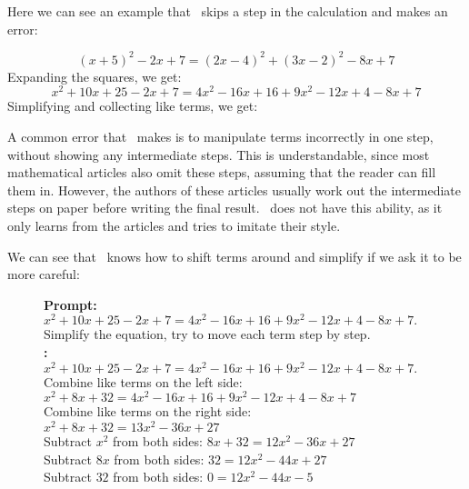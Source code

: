 Here we can see an example that \DV \ skips a step in the calculation and makes an error:

\begin{AIbox}{\DV}\scriptsize
$$(x + 5)^2 - 2x + 7 = (2x - 4)^2 + (3x - 2)^2 - 8x + 7$$
Expanding the squares, we get:
$$x^2 + 10x + 25 - 2x + 7 = 4x^2 - 16x + 16 + 9x^2 - 12x + 4 - 8x + 7$$
Simplifying and collecting like terms, we get:
\end{AIbox}


A common error that \DV \ makes is to manipulate terms incorrectly in one step, without showing any intermediate steps. This is understandable, since most mathematical articles also omit these steps, assuming that the reader can fill them in. However, the authors of these articles usually work out the intermediate steps on paper before writing the final result. \DV \ does not have this ability, as it only learns from the articles and tries to imitate their style.

We can see that \DV \ knows how to shift terms around and simplify if we ask it to be more careful:
\begin{figure}[H]
\begin{AIbox}{\DV}
{\bf Prompt:} \\
{\scriptsize
$x^2 + 10x + 25 - 2x + 7 = 4x^2 - 16x + 16 + 9x^2 - 12x + 4 - 8x + 7.$\\
Simplify the equation, try to move each term step by step. 
}\\

{\bf \DV:} \\
{\scriptsize
$x^2 + 10x + 25 - 2x + 7 = 4x^2 - 16x + 16 + 9x^2 - 12x + 4 - 8x + 7.$\\
Combine like terms on the left side: $x^2 + 8x + 32 = 4x^2 - 16x + 16 + 9x^2 - 12x + 4 - 8x + 7$\\
Combine like terms on the right side: $x^2 + 8x + 32 = 13x^2 - 36x + 27$\\
Subtract $x^2$ from both sides: $8x + 32 = 12x^2 - 36x + 27$\\
Subtract $8x$ from both sides: $32 = 12x^2 - 44x + 27$\\
Subtract $32$ from both sides: $0 = 12x^2 - 44x - 5$\\
}
\end{AIbox}
\end{figure}

